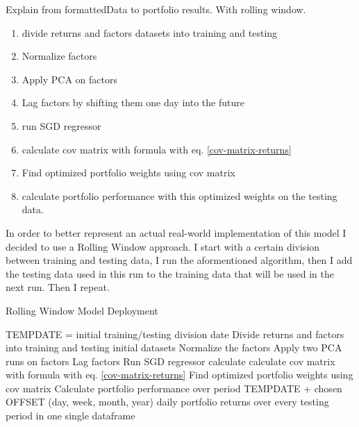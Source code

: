 
Explain from formattedData to portfolio results. With rolling window. 

\begin{enumerate}
\item divide returns and factors datasets into training and testing
\item Normalize factors
\item Apply PCA on factors
\item Lag factors by shifting them one day into the future
\item run SGD regressor
\item calculate cov matrix with formula with eq. \eqref{cov-matrix-returns}
\item Find optimized portfolio weights using cov matrix 
\item calculate portfolio performance with this optimized weights on the testing data.
\end{enumerate}
In order to better represent an actual real-world implementation of this model I decided to use a Rolling Window approach. I start with a certain division between training and testing data, I run the aformentioned algorithm, then I add the testing data used in this run to the training data that will be used in the next run. Then I repeat. 

\begin{algorithm}
	\caption{Rolling Window Model Deployment}
	\begin{algorithmic}[1]
		\STATE TEMPDATE = initial training/testing division date
		\STATE Divide returns and factors into training and testing initial datasets
		\STATE Normalize the factors
		\STATE Apply two PCA runs on factors
		\STATE Lag factors
		\STATE Run SGD regressor
		\STATE calculate calculate cov matrix with formula with eq. \eqref{cov-matrix-returns}
		\STATE Find optimized portfolio weights using cov matrix
		\STATE Calculate portfolio performance over period
		\STATE TEMPDATE + chosen OFFSET (day, week, month, year)
		\ENDWHILE
		\RETURN daily portfolio returns over every testing period in one single dataframe
	\end{algorithmic}
\end{algorithm}